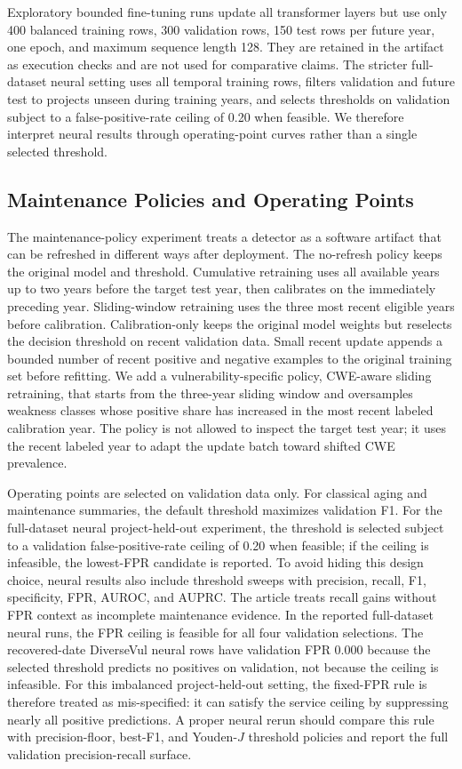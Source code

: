 \documentclass[a4paper,fleqn]{cas-dc}
\begin{document}
Exploratory bounded fine-tuning runs update all transformer layers but use only
400 balanced training rows, 300 validation rows, 150 test rows per future year,
one epoch, and maximum sequence length 128. They are retained in the artifact
as execution checks and are not used for comparative claims. The stricter
full-dataset neural setting uses all temporal training rows, filters validation
and future test to projects unseen during training years, and selects
thresholds on validation subject to a false-positive-rate ceiling of 0.20 when
feasible. We therefore interpret neural results through operating-point curves
rather than a single selected threshold.

\subsection{Maintenance Policies and Operating Points}

The maintenance-policy experiment treats a detector as a software artifact
that can be refreshed in different ways after deployment. The no-refresh policy
keeps the original model and threshold. Cumulative retraining uses all
available years up to two years before the target test year, then calibrates on
the immediately preceding year. Sliding-window retraining uses the three most
recent eligible years before calibration. Calibration-only keeps the original
model weights but reselects the decision threshold on recent validation data.
Small recent update appends a bounded number of recent positive and negative
examples to the original training set before refitting. We add a
vulnerability-specific policy, CWE-aware sliding retraining, that starts from
the three-year sliding window and oversamples weakness classes whose positive
share has increased in the most recent labeled calibration year. The policy is
not allowed to inspect the target test year; it uses the recent labeled year to
adapt the update batch toward shifted CWE prevalence.

Operating points are selected on validation data only. For classical aging and
maintenance summaries, the default threshold maximizes validation F1. For the
full-dataset neural project-held-out experiment, the threshold is selected
subject to a validation false-positive-rate ceiling of 0.20 when feasible; if
the ceiling is infeasible, the lowest-FPR candidate is reported. To avoid
hiding this design choice, neural results also include threshold sweeps with
precision, recall, F1, specificity, FPR, AUROC, and AUPRC\@. The article treats
recall gains without FPR context as incomplete maintenance evidence.
In the reported full-dataset neural runs, the FPR ceiling is feasible for all
four validation selections. The recovered-date DiverseVul neural rows have
validation FPR 0.000 because the selected threshold predicts no positives on
validation, not because the ceiling is infeasible. For this imbalanced
project-held-out setting, the fixed-FPR rule is therefore treated as
mis-specified: it can satisfy the service ceiling by suppressing nearly all
positive predictions. A proper neural rerun should compare this rule with
precision-floor, best-F1, and Youden-\(J\) threshold policies and report the
full validation precision-recall surface.
\end{document}
